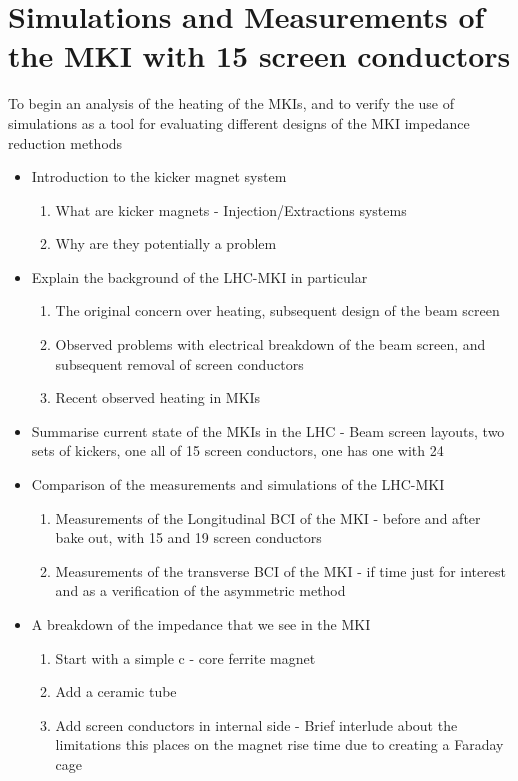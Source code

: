 \section{Simulations and Measurements of the MKI with 15 screen conductors}

To begin an analysis of the heating of the MKIs, and to verify the use of simulations as a tool for evaluating different designs of the MKI impedance reduction methods

\begin{itemize}
\item{Introduction to the kicker magnet system}
\begin{enumerate}
\item{What are kicker magnets - Injection/Extractions systems}
\item{Why are they potentially a problem}
\end{enumerate}
\item{Explain the background of the LHC-MKI in particular}
\begin{enumerate}
\item{The original concern over heating, subsequent design of the beam screen}
\item{Observed problems with electrical breakdown of the beam screen, and subsequent removal of screen conductors}
\item{Recent observed heating in MKIs}
\end{enumerate}
\item{Summarise current state of the MKIs in the LHC - Beam screen layouts, two sets of kickers, one all of 15 screen conductors, one has one with 24}
\item{Comparison of the measurements and simulations of the LHC-MKI}
\begin{enumerate}
\item{Measurements of the Longitudinal BCI of the MKI - before and after bake out, with 15 and 19 screen conductors}
\item{Measurements of the transverse BCI of the MKI - if time just for interest and as a verification of the asymmetric method}
\end{enumerate}
\item{A breakdown of the impedance that we see in the MKI}
\begin{enumerate}
\item{Start with a simple c - core ferrite magnet}
\item{Add a ceramic tube}
\item{Add screen conductors in internal side - Brief interlude about the limitations this places on the magnet rise time due to creating a Faraday cage}

\end{enumerate}
\end{itemize}
